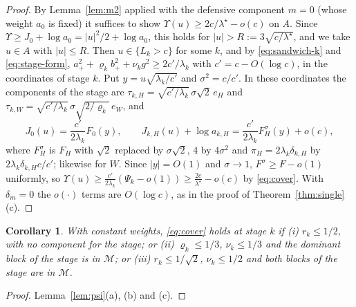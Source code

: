 \documentclass[pdflatex,sn-mathphys-ay]{sn-jnl}%
\theoremstyle{thmstyleone}%
\newtheorem{corollary}{Corollary}
\theoremstyle{thmstylethree}%
\theoremstyle{thmstyletwo}%
\begin{document}
\begin{proof}
By Lemma~\ref{lem:m2} applied with the defensive component $m=0$ (whose weight $a_0$ is
fixed) it suffices to show
$\Upsilon(u)\ge2c/\lambda^\star-o(c)$ on $A$. Since $\Upsilon\ge J_0+\log a_0=|u|^2/2+\log a_0$,
this holds for $|u|>R:=3\sqrt{c/\lambda^\star}$, and we take $u\in A$ with $|u|\le R$.
Then $u\in\{L_k>c\}$ for some $k$, and by \eqref{eq:sandwich-k} and
\eqref{eq:stage-form}, $a_+^2+\varrho_kb_+^2+\nu_kg^2\ge2c'/\lambda_k$ with
$c'=c-O(\log c)$, in the coordinates of stage $k$. Put $y=u\sqrt{\lambda_k/c'}$ and
$\sigma^2=c/c'$. In these coordinates the components of the stage are
$\tau_{k,H}=\sqrt{c'/\lambda_k}\,\sigma\sqrt2\,e_H$ and
$\tau_{k,W}=\sqrt{c'/\lambda_k}\,\sigma\sqrt{2/\varrho_k}\,e_W$, and
\[
J_0(u)=\frac{c'}{2\lambda_k}F_0(y),\qquad
J_{k,H}(u)+\log a_{k,H}=\frac{c'}{2\lambda_k}F^\sigma_H(y)+o(c),
\]
where $F^\sigma_H$ is $F_H$ with $\sqrt2$ replaced by $\sigma\sqrt2$, $4$ by $4\sigma^2$ and
$\pi_H=2\lambda_k\delta_{k,H}$ by $2\lambda_k\delta_{k,H}c/c'$; likewise for $W$. Since
$|y|=O(1)$ and $\sigma\to1$, $F^\sigma\ge F-o(1)$ uniformly, so
$\Upsilon(u)\ge\frac{c'}{2\lambda_k}(\Psi_k-o(1))\ge\frac{2c}{\lambda^\star}-o(c)$ by
\eqref{eq:cover}. With $\delta_m=0$ the $o(\cdot)$ terms are $O(\log c)$, as in the proof
of Theorem~\ref{thm:single}(c).
\end{proof}

\begin{corollary}\label{cor:closed}
With constant weights, \eqref{eq:cover} holds at stage $k$ if (i) $r_k\le1/2$, with no
component for the stage; or (ii) $\varrho_k\le1/3$, $\nu_k\le1/3$ and the dominant block
of the stage is in $\mathcal M$; or (iii) $r_k\le1/\sqrt2$, $\nu_k\le1/2$ and both blocks
of the stage are in $\mathcal M$.
\end{corollary}

\begin{proof}
Lemma~\ref{lem:psi}(a), (b) and (c).
\end{proof}
\end{document}
